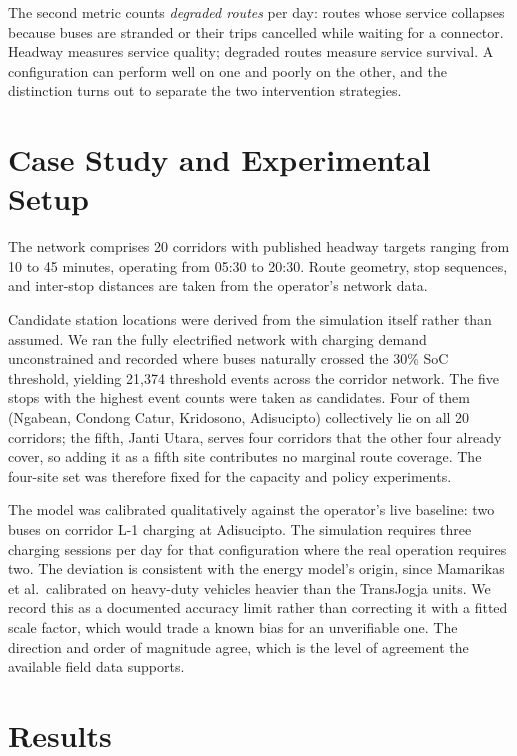 \documentclass[conference]{IEEEtran}
\begin{document}
The second metric counts \emph{degraded routes} per day: routes whose
service collapses because buses are stranded or their trips cancelled
while waiting for a connector. Headway measures service quality;
degraded routes measure service survival. A configuration can perform
well on one and poorly on the other, and the distinction turns out to
separate the two intervention strategies.

\section{Case Study and Experimental Setup}

The network comprises 20 corridors with published headway targets ranging
from 10 to 45 minutes, operating from 05:30 to 20:30. Route geometry,
stop sequences, and inter-stop distances are taken from the operator's
network data.

Candidate station locations were derived from the simulation itself
rather than assumed. We ran the fully electrified network with charging
demand unconstrained and recorded where buses naturally crossed the 30\%
SoC threshold, yielding 21{,}374 threshold events across the corridor
network. The five stops with the highest event counts were taken as
candidates. Four of them (Ngabean, Condong Catur, Kridosono, Adisucipto)
collectively lie on all 20 corridors; the fifth, Janti Utara, serves four
corridors that the other four already cover, so adding it as a fifth site
contributes no marginal route coverage. The four-site set was therefore
fixed for the capacity and policy experiments.

The model was calibrated qualitatively against the operator's live
baseline: two buses on corridor L-1 charging at Adisucipto. The
simulation requires three charging sessions per day for that
configuration where the real operation requires two. The deviation is
consistent with the energy model's origin, since Mamarikas et al.\
calibrated on heavy-duty vehicles heavier than the TransJogja units. We
record this as a documented accuracy limit rather than correcting it with
a fitted scale factor, which would trade a known bias for an unverifiable
one. The direction and order of magnitude agree, which is the level of
agreement the available field data supports.

\section{Results}
\end{document}
